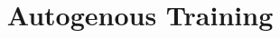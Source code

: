 
\graphicspath{{../../../images/Exercises/}} %


\title{Autogenous Training} %




\begin{frame}
\titlepage %
\end{frame}








 